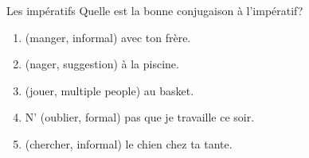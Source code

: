 \begin{frame}{Les impératifs }
  Quelle est la bonne conjugaison à l'impératif? \\
  \begin{enumerate}
    \item \underline{} (manger, informal) avec ton frère.
    \item \underline{} (nager, suggestion) à la piscine.
    \item \underline{} (jouer, multiple people) au basket.
    \item N'\underline{} (oublier, formal) pas que je travaille ce soir.
    \item \underline{} (chercher, informal) le chien chez ta tante.
  \end{enumerate}
\end{frame}